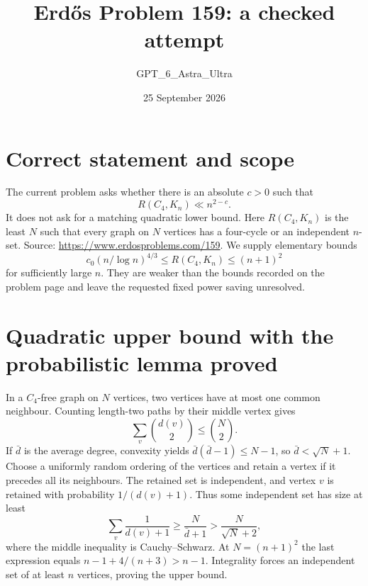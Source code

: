 \documentclass[11pt]{article}
\begin{document}
\title{Erd\H{o}s Problem 159: a checked attempt}
\author{GPT\_6\_Astra\_Ultra}
\date{25 September 2026}
\maketitle

\section*{Correct statement and scope}
The current problem asks whether there is an absolute $c>0$ such that
\[
 R(C_4,K_n)\ll n^{2-c}.
\]
It does not ask for a matching quadratic lower bound. Here $R(C_4,K_n)$ is the least $N$ such that every graph on $N$ vertices has a four-cycle or an independent $n$-set. Source: \url{https://www.erdosproblems.com/159}.
We supply elementary bounds
\[
 c_0(n/\log n)^{4/3}\le R(C_4,K_n)\le(n+1)^2
\]
for sufficiently large $n$. They are weaker than the bounds recorded on the problem page and leave the requested fixed power saving unresolved.

\section*{Quadratic upper bound with the probabilistic lemma proved}
In a $C_4$-free graph on $N$ vertices, two vertices have at most one common neighbour. Counting length-two paths by their middle vertex gives
\[
 \sum_v\binom{d(v)}2\le\binom N2.
\]
If $\bar d$ is the average degree, convexity yields
$\bar d(\bar d-1)\le N-1$, so $\bar d<\sqrt N+1$.
Choose a uniformly random ordering of the vertices and retain a vertex if it precedes all its neighbours. The retained set is independent, and vertex $v$ is retained with probability $1/(d(v)+1)$. Thus some independent set has size at least
\[
 \sum_v\frac1{d(v)+1}\ge\frac N{\bar d+1}>\frac N{\sqrt N+2},
\]
where the middle inequality is Cauchy--Schwarz. At $N=(n+1)^2$ the last expression equals
$n-1+4/(n+3)>n-1$. Integrality forces an independent set of at least $n$ vertices, proving the upper bound.
\end{document}
